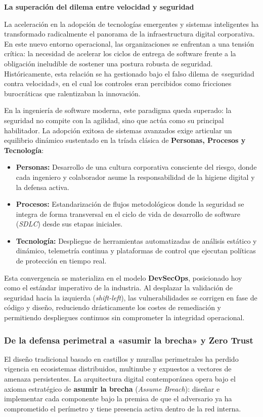 \par\textbf{\textcolor{unabblue}{}\quad La superación del dilema entre velocidad y seguridad}\par
La aceleración en la adopción de tecnologías emergentes y sistemas inteligentes ha transformado radicalmente el panorama de la infraestructura digital corporativa. En este nuevo entorno operacional, las organizaciones se enfrentan a una tensión crítica: la necesidad de acelerar los ciclos de entrega de software frente a la obligación ineludible de sostener una postura robusta de seguridad. Históricamente, esta relación se ha gestionado bajo el falso dilema de «seguridad contra velocidad», en el cual los controles eran percibidos como fricciones burocráticas que ralentizaban la innovación.

En la ingeniería de software moderna, este paradigma queda superado: la seguridad no compite con la agilidad, sino que actúa como su principal habilitador. La adopción exitosa de sistemas avanzados exige articular un equilibrio dinámico sustentado en la tríada clásica de \textbf{Personas, Procesos y Tecnología}:
\begin{itemize}
  \item \textbf{Personas:} Desarrollo de una cultura corporativa consciente del riesgo, donde cada ingeniero y colaborador asume la responsabilidad de la higiene digital y la defensa activa.
  \item \textbf{Procesos:} Estandarización de flujos metodológicos donde la seguridad se integra de forma transversal en el ciclo de vida de desarrollo de software (\textit{SDLC}) desde sus etapas iniciales.
  \item \textbf{Tecnología:} Despliegue de herramientas automatizadas de análisis estático y dinámico, telemetría continua y plataformas de control que ejecutan políticas de protección en tiempo real.
\end{itemize}

Esta convergencia se materializa en el modelo \textbf{DevSecOps}, posicionado hoy como el estándar imperativo de la industria. Al desplazar la validación de seguridad hacia la izquierda (\textit{shift-left}), las vulnerabilidades se corrigen en fase de código y diseño, reduciendo drásticamente los costes de remediación y permitiendo despliegues continuos sin comprometer la integridad operacional.

\subsubsection*{\textcolor{unabblue}{}\quad De la defensa perimetral a «asumir la brecha» y Zero Trust}
El diseño tradicional basado en castillos y murallas perimetrales ha perdido vigencia en ecosistemas distribuidos, multinube y expuestos a vectores de amenaza persistentes. La arquitectura digital contemporánea opera bajo el axioma estratégico de \textbf{asumir la brecha} (\textit{Assume Breach}): diseñar e implementar cada componente bajo la premisa de que el adversario ya ha comprometido el perímetro y tiene presencia activa dentro de la red interna.

